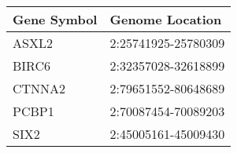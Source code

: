 \begin{tabular}{ll}
\toprule
Gene Symbol &     Genome Location \\
\midrule
      ASXL2 & 2:25741925-25780309 \\
      BIRC6 & 2:32357028-32618899 \\
     CTNNA2 & 2:79651552-80648689 \\
      PCBP1 & 2:70087454-70089203 \\
       SIX2 & 2:45005161-45009430 \\
\bottomrule
\end{tabular}

